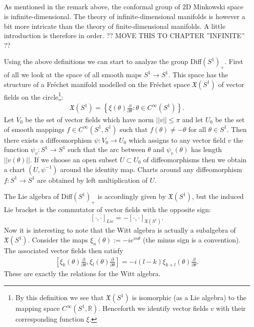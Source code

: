 \subsection{}

    As mentioned in the remark above, the conformal group of 2D Minkowski space is infinite-dimensional. The theory of infinite-dimensional manifolds is however a bit more intricate than the theory of finite-dimensional manifolds. A little introduction is therefore in order. ?? MOVE THIS TO CHAPTER ''INFINITE'' ??


    Using the above definitions we can start to analyze the group Diff$(S^1)_+$. First of all we look at the space of all smooth maps $S^1\rightarrow S^1$. This space has the structure of a Fr\'echet manifold modelled on the Fr\'echet space $\mathfrak{X}(S^1)$ of vector fields on the circle\footnote{By this definition we see that $\mathfrak{X}(S^1)$ is isomorphic (as a Lie algebra) to the mapping space $C^\infty(S^1, \mathbb{R})$. Henceforth we identify vector fields $v$ with their corresponding function $\xi$.}:
    \begin{gather}
        \mathfrak{X}(S^1) = \left\{\xi(\theta)\frac{\partial}{\partial\theta}:\theta\in C^\infty(S^1)\right\}.
    \end{gather}
    Let $V_0$ be the set of vector fields which have norm $||v||\leq\pi$ and let $U_0$ be the set of smooth mappings $f\in C^\infty(S^1, S^1)$ such that $f(\theta)\neq-\theta$ for all $\theta\in S^1$. Then there exists a diffeomorphism $\psi:V_0\rightarrow U_0$ which assigns to any vector field $v$ the function $\psi_v:S^1\rightarrow S^1$ such that the arc between $\theta$ and $\psi_v(\theta)$ has length $||v(\theta)||$. If we choose an open subset $U\subset U_0$ of diffeomorphisms then we obtain a chart $(U, \psi^{-1})$ around the identity map. Charts around any diffeomorphism $f:S^1\rightarrow S^1$ are obtained by left multiplication of $U$.

    The Lie algebra of Diff$(S^1)_+$ is accordingly given by $\mathfrak{X}(S^1)$, but the induced Lie bracket is the commutator of vector fields with the opposite sign: \[[\cdot, \cdot]_{Lie} = -[\cdot, \cdot]_{\mathfrak{X}(S^1)}.\] Now it is interesting to note that the Witt algebra is actually a subalgebra of $\mathfrak{X}(S^1)$. Consider the maps $\xi_n(\theta):=-ie^{in\theta}$ (the minus sign is a convention). The associated vector fields then satisfy
    \begin{gather}
        \left[\xi_k(\theta)\frac{\partial}{\partial\theta}, \xi_l(\theta)\frac{\partial}{\partial\theta}\right] = -i(l-k)\xi_{k+l}(\theta)\frac{\partial}{\partial\theta}.
    \end{gather}
    These are exactly the relations for the Witt algebra.

